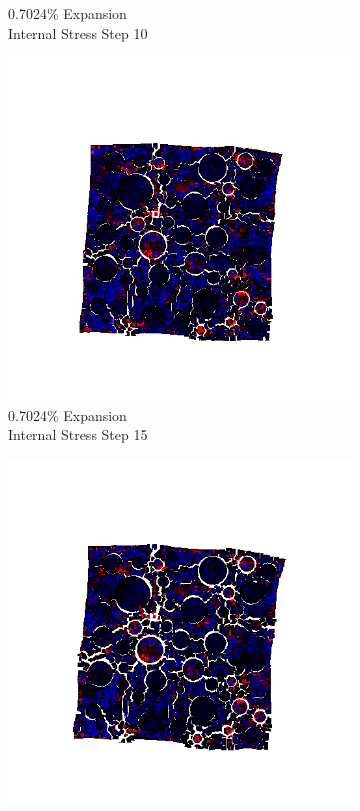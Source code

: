 \begin{figure}[ht!]
\begin{subfigure}{.25\textwidth}
      \caption{0.7024\% Expansion\\Internal Stress Step 10}
    \end{subfigure}%
    \begin{subfigure}{.25\textwidth}
      \centering
      \includegraphics[width=1.0\linewidth]{Files/exp_3D/ASR/A30P25_3_s15.png}
      \caption{0.7024\% Expansion\\Internal Stress Step 15}
    \end{subfigure}%
    \begin{subfigure}{.25\textwidth}
      \centering
      \includegraphics[width=1.0\linewidth]{Files/exp_3D/ASR/A30P25_3_stress.png}

\end{subfigure}
\end{figure}
